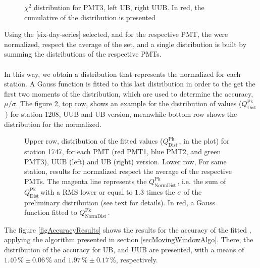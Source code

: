 \documentclass[twoside, final, 10pt]{articleMine}
\newcommand{\qpkDist}{$Q^\mathrm{Pk}_\mathrm{Dist}$\,}
\newcommand{\qpkNormDist}{$Q^\mathrm{Pk}_\mathrm{NormDist}$\,}
\begin{document}
\begin{figure}[!t]
  \centering
  \caption{$\chi^2$ distribution for PMT3, left UB, right UUB. In
  red, the cumulative of the distribution is presented}
  \label{figChi2VsSlopProjChi2Pmt3}
\end{figure}

\noindent Using the [six-day-series] selected, and for the
respective PMT, the \qpkvem were normalized, respect the average
of the set, and a single distribution is built by summing the
distributions of the respective PMTs.\\\\In this way, we obtain a
distribution that represents the \qpkvem normalized for each
station. A Gauss function is fitted to this last distribution in
order to the get the first two moments of the distribution, which
are used to determine the accuracy, $\mu/\sigma$. The figure
\ref{fig1747QpkValues}, top row, shows an example for the
distribution of \qpkvem values (\qpkDist) for station $1208$, UUB
and UB version, meanwhile bottom row shows the distribution for
the \qpkvem normalized.
\clearpage

\begin{figure}[!t]
  \centering
  \caption{Upper row, distribution of the fitted \qpkvem values
  (\qpkDist, in the plot) for station 1747, for each PMT (red
  PMT1, blue PMT2, and green PMT3), UUB (left) and UB (right)
  version. Lower row, For same station, results for \qpkvem
  normalized respect the average of the respective PMTs. The
  magenta line represents the \qpkNormDist, i.e. the sum of
  \qpkDist with a RMS lower or equal to $1.3$ times the $\sigma$
  of the preliminary distribution (see text for details). In red,
  a Gauss function fitted to \qpkNormDist.}
  \label{fig1747QpkValues}
\end{figure}

The figure \ref{figAccuracyResults} shows the results for the
accuracy of the fitted \qpkvem, applying the algorithm presented
in section \ref{secMovingWindowAlgo}. There, the distribution of the
accuracy for UB, and UUB are presented, with a means of
$1.40\,\%\pm0.06\,\%$ and $1.97\,\%\pm0.17\,\%$, respectively.
\clearpage
\end{document}
